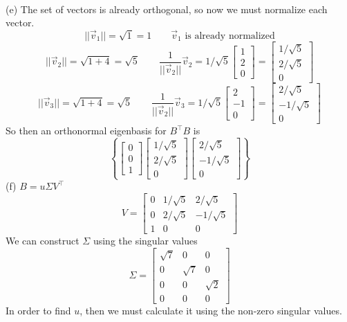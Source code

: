 \documentclass{report}
\begin{document}
\\
\noindent(e) The set of vectors is already orthogonal, so now we must normalize each vector.
$$
||\vec{v}_1|| = \sqrt{1} = 1 \qquad \vec{v}_1\text{ is already normalized}
$$
$$
||\vec{v}_2|| = \sqrt{1 + 4} = \sqrt{5} \qquad \frac{1}{||\vec{v}_2||}\vec{v}_2 = 1/\sqrt{5}\begin{bmatrix}1\\2\\0\end{bmatrix} = \begin{bmatrix}1/\sqrt{5}\\2/\sqrt{5}\\0\end{bmatrix}
$$
$$
||\vec{v}_3|| = \sqrt{1 + 4} = \sqrt{5} \qquad \frac{1}{||\vec{v}_2||}\vec{v}_3 = 1/\sqrt{5}\begin{bmatrix}2\\-1\\0\end{bmatrix} = \begin{bmatrix}2/\sqrt{5}\\-1/\sqrt{5}\\0\end{bmatrix}
$$
So then an orthonormal eigenbasis for $B^\top B$ is
$$
\left\{
\begin{bmatrix}0\\0\\1\end{bmatrix}
\begin{bmatrix}1/\sqrt{5}\\2/\sqrt{5}\\0\end{bmatrix}
\begin{bmatrix}2/\sqrt{5}\\-1/\sqrt{5}\\0\end{bmatrix}
\right\}
$$
(f) $B = u\Sigma V^\top$
$$
V = \begin{bmatrix}
0&1/\sqrt{5}&2/\sqrt{5}\\
0&2/\sqrt{5}&-1/\sqrt{5}\\
1&0&0
\end{bmatrix}
$$
We can construct $\Sigma$ using the singular values
$$
\Sigma = \begin{bmatrix}
\sqrt{7}&0&0\\
0&\sqrt{7}&0\\
0&0&\sqrt{2}\\
0&0&0
\end{bmatrix}
$$
In order to find $u$, then we must calculate it using the non-zero singular values.
\end{document}
